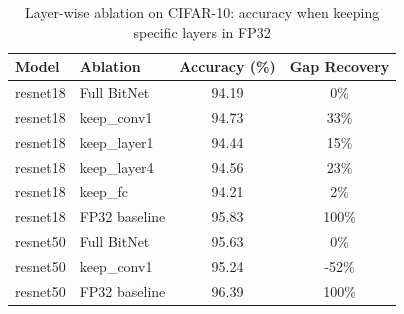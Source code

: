 \begin{table}[h]
\centering
\caption{Layer-wise ablation on CIFAR-10: accuracy when keeping specific layers in FP32}
\label{tab:layer_ablation_cifar10}
\begin{tabular}{llcc}
\toprule
Model & Ablation & Accuracy (\%) & Gap Recovery \\
\midrule
resnet18 & Full BitNet & 94.19 & 0\% \\
resnet18 & keep\_conv1 & 94.73 & 33\% \\
resnet18 & keep\_layer1 & 94.44 & 15\% \\
resnet18 & keep\_layer4 & 94.56 & 23\% \\
resnet18 & keep\_fc & 94.21 & 2\% \\
resnet18 & FP32 baseline & 95.83 & 100\% \\
\midrule
resnet50 & Full BitNet & 95.63 & 0\% \\
resnet50 & keep\_conv1 & 95.24 & -52\% \\
resnet50 & FP32 baseline & 96.39 & 100\% \\
\bottomrule
\end{tabular}
\end{table}